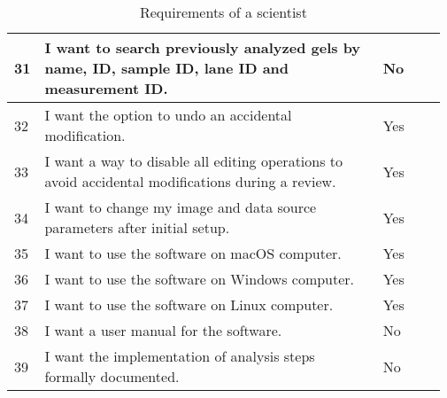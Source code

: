 \begin{table}[h!]
\begin{tabular}{|p{0.02\linewidth}|p{0.80\linewidth}|p{0.15\linewidth}|}
31 & I want to search previously analyzed gels by name, ID, sample ID, lane ID and measurement ID. & No\\ \hline
32 & I want the option to undo an accidental modification. & Yes\\ \hline
33 & I want a way to disable all editing operations to avoid accidental modifications during a review. & Yes\\ \hline
34 & I want to change my image and data source parameters after initial setup. & Yes\\ \hline
35 & I want to use the software on macOS computer. & Yes\\ \hline
36 & I want to use the software on Windows computer. & Yes\\ \hline
37 & I want to use the software on Linux computer. & Yes\\ \hline
38 & I want a user manual for the software. & No\\ \hline
39 & I want the implementation of analysis steps formally documented. & No\\ \hline
\end{tabular}
\caption{Requirements of a scientist}\label{table:requirements-scientist}
\end{table}
